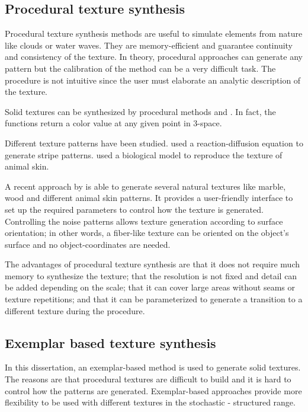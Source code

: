 \subsection{Procedural texture synthesis}

Procedural texture synthesis methods are useful to simulate elements from nature 
like clouds or water waves. 
They are memory-efficient and guarantee continuity and consistency of the texture.
In theory, procedural approaches 
can generate any pattern but the calibration of the method can be a very difficult task. 
The procedure is not intuitive since the user must elaborate an analytic description of the texture.

Solid textures can be synthesized by procedural methods
\cite{perlin1985image} and \cite{peachey1985solid}.
In fact, the functions return
a color value at any given point in 3-space.

Different texture patterns have been studied.
\cite{witkin1991reaction} used a reaction-diffusion equation to generate 
stripe patterns.
\cite{walter2001integrating} used a biological model
to reproduce the texture of animal skin.

A recent approach by \cite{lagae2009procedural}
is able to generate several
natural textures like marble, wood and
different animal skin patterns. It provides 
a user-friendly interface to set up the required parameters 
to control how the texture is generated. 
Controlling the noise patterns allows texture generation according 
to surface orientation; in other words, a fiber-like texture
can be oriented on the object's surface and no object-coordinates are needed.

The advantages of procedural texture synthesis are that
it does not require much memory to synthesize the texture; 
that the resolution is not fixed and detail can be added depending on the scale;
that it can cover large areas without seams or texture repetitions;
and that it can be parameterized to generate a transition to a different texture during the procedure.

\subsection{Exemplar based texture synthesis}

In this dissertation, an exemplar-based method is used to generate solid textures. 
The reasons are that procedural textures
are difficult to build and it is hard to control how the patterns are generated.
Exemplar-based approaches provide more flexibility to be used with 
different textures in the stochastic - structured range. 

